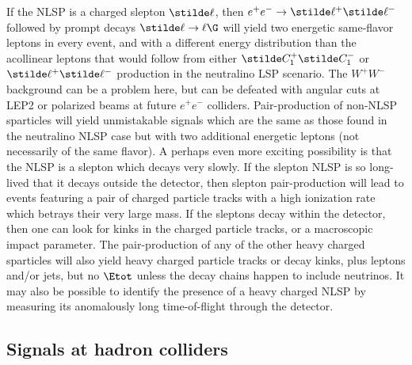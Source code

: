 If the NLSP is a charged slepton $\stilde \ell$, then
$e^+e^-\rightarrow \stilde \ell^+\stilde \ell^-$ followed by prompt
decays $\stilde \ell\rightarrow \ell \G$ will yield
two energetic same-flavor leptons in every event,
and with a different energy distribution than the acollinear leptons
that would follow from either $\stilde C_1^+\stilde C_1^-$
or $\stilde \ell^+\stilde \ell^-$ production in the neutralino
LSP scenario. The $W^+W^-$ background can be a problem here, but can
be defeated with angular cuts at LEP2 or polarized beams at future
$e^+e^-$ colliders. Pair-production of non-NLSP sparticles will yield
unmistakable signals which are the same as those found in the neutralino
NLSP case but with two additional energetic leptons (not necessarily
of the same flavor). A perhaps even more exciting possibility is that the
NLSP is
a slepton which decays very slowly.\cite{DDRT} If the slepton NLSP is
so long-lived that it decays outside the detector, then slepton
pair-production
will lead to events featuring a pair of charged particle tracks
with a high ionization rate which betrays their very large mass.
If the sleptons decay within the detector, then one can look for kinks
in the charged particle tracks, or a macroscopic impact
parameter. The pair-production of any of the other
heavy charged sparticles will also yield heavy charged particle
tracks or decay kinks, plus leptons and/or jets, but no
$\Etot$ unless the decay chains happen to include neutrinos.
It may also be possible to identify the presence of a heavy charged
NLSP by measuring its anomalously long time-of-flight through the
detector.

\subsection{Signals at hadron colliders}\label{subsec:signals.FNALLHC}

